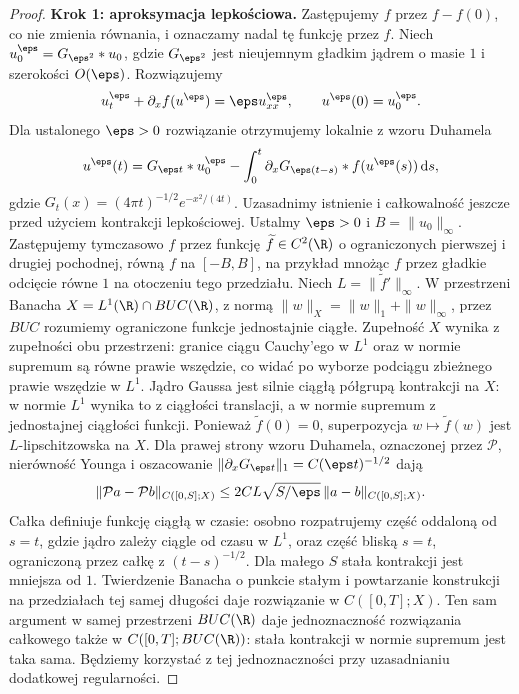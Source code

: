 \begin{proof}
\textbf{Krok 1: aproksymacja lepkościowa.}
Zastępujemy $f$ przez $f-f(0)$, co nie zmienia równania,
i oznaczamy nadal tę funkcję przez $f$.
Niech $u_0^\eps=G_{\eps^2}*u_0$, gdzie $G_{\eps^2}$ jest
nieujemnym gładkim jądrem o masie $1$ i szerokości
$O(\eps)$. Rozwiązujemy
\begin{equation}\label{eq:pde24-visc}
 u_t^\eps+\partial_x f(u^\eps)=\eps u_{xx}^\eps,
 \qquad u^\eps(0)=u_0^\eps.
\end{equation}
Dla ustalonego $\eps>0$ rozwiązanie otrzymujemy
lokalnie z wzoru Duhamela
\[
 u^\eps(t)=G_{\eps t}*u_0^\eps
 -\int_0^t\partial_xG_{\eps(t-s)}*f(u^\eps(s))\,\mathrm ds,
\]
gdzie $G_t(x)=(4\pi t)^{-1/2}e^{-x^2/(4t)}$.
Uzasadnimy istnienie i całkowalność jeszcze przed
użyciem kontrakcji lepkościowej. Ustalmy $\eps>0$ i
$B=\|u_0\|_\infty$. Zastępujemy tymczasowo $f$ przez
funkcję $\widetilde f\in C^2(\R)$ o ograniczonych
pierwszej i drugiej pochodnej, równą $f$ na $[-B,B]$,
na przykład mnożąc $f$ przez gładkie odcięcie równe
$1$ na otoczeniu tego przedziału. Niech
$L=\|\widetilde f'\|_\infty$.
W przestrzeni Banacha
$X=L^1(\R)\cap BUC(\R)$, z normą
$\|w\|_X=\|w\|_1+\|w\|_\infty$, przez $BUC$ rozumiemy
ograniczone funkcje jednostajnie ciągłe. Zupełność
$X$ wynika z zupełności obu przestrzeni: granice ciągu
Cauchy'ego w $L^1$ oraz w normie supremum są równe
prawie wszędzie, co widać po wyborze podciągu
zbieżnego prawie wszędzie w $L^1$. Jądro Gaussa
jest silnie ciągłą półgrupą kontrakcji na $X$:
w normie $L^1$ wynika to z ciągłości translacji,
a w normie supremum z jednostajnej ciągłości funkcji.
Ponieważ $\widetilde f(0)=0$, superpozycja
$w\mapsto\widetilde f(w)$ jest $L$-lipschitzowska na $X$.
Dla prawej strony wzoru Duhamela, oznaczonej przez
$\mathcal P$, nierówność Younga i oszacowanie
$\|\partial_xG_{\eps t}\|_1=C(\eps t)^{-1/2}$ dają
\[
 \|\mathcal P a-\mathcal P b\|_{C([0,S];X)}
 \le 2CL\sqrt{S/\eps}\,
     \|a-b\|_{C([0,S];X)}.
\]
Całka definiuje funkcję ciągłą w czasie: osobno
rozpatrujemy część oddaloną od $s=t$, gdzie jądro
zależy ciągle od czasu w $L^1$, oraz część bliską
$s=t$, ograniczoną przez całkę z $(t-s)^{-1/2}$.
Dla małego $S$ stała kontrakcji jest mniejsza od $1$.
Twierdzenie Banacha o punkcie stałym i powtarzanie
konstrukcji na przedziałach tej samej długości daje
rozwiązanie w $C([0,T];X)$. Ten sam argument
w samej przestrzeni $BUC(\R)$ daje jednoznaczność
rozwiązania całkowego także w $C([0,T];BUC(\R))$:
stała kontrakcji w normie supremum jest taka sama.
Będziemy korzystać z tej jednoznaczności przy
uzasadnianiu dodatkowej regularności.


\end{proof}
